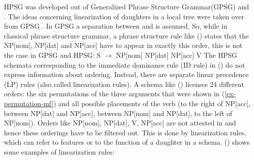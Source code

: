\documentclass[output=paper
	        ,collection
	        ,collectionchapter
 	        ,biblatex
                ,babelshorthands
                ,newtxmath
                ,draftmode
                ,colorlinks, citecolor=brown
]{langscibook}
\begin{document}
HPSG was developed out of Generalized Phrase Structure Grammar\indexgpsg (GPSG) and . The ideas concerning linearization of
daughters in a local tree were taken over from GPSG \citep*[Section~3.2]{GKPS85a}. In GPSG a separation between
 and  is assumed. So, while in classical phrase structure
grammar, a phrase structure rule like () states that the NP[nom], NP[dat] and NP[acc] have to
appear in exactly this order, this is not the case in GPSG and HPSG:
\ea
\label{rule-s-np-np-np-v}
S $\to$ NP[nom] NP[dat] NP[acc] V
\z
The HPSG schemata corresponding to the immediate dominance rule (ID rule) in () do not express information
about ordering. Instead, there are separate linear precedence (LP) rules
(also called linearization rules). A schema like () licenses 24 
different orders: the six permutations of the three arguments that were shown in
(\ref{ex-permutation-mf}) and all possible placements of the verb (to the right of NP[acc], between
NP[dat] and NP[acc], between NP[nom] and NP[dat], to the left of NP[nom]). Orders like NP[nom],
NP[dat], V, NP[acc] are not attested in  and hence these orderings have to be filtered
out. This is done by linearization rules, which can refer to features or to the function of a
daughter in a schema. () shows some examples of linearization rules:
\end{document}
